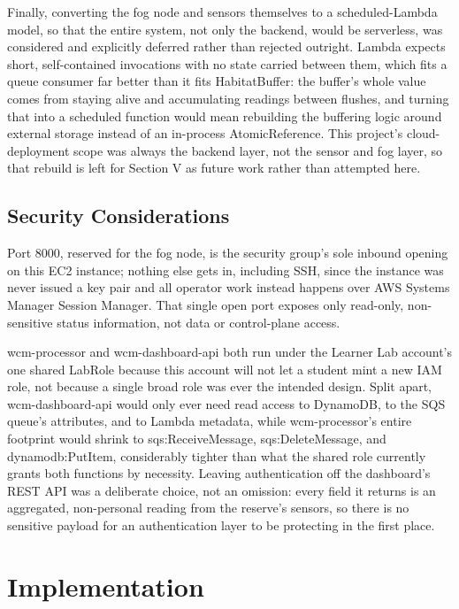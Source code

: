 \documentclass[conference,a4paper]{IEEEtran}
\begin{document}
Finally, converting the fog node and sensors themselves to a scheduled-Lambda model, so that the entire system, not only the backend, would be serverless, was considered and explicitly deferred rather than rejected outright. Lambda expects short, self-contained invocations with no state carried between them, which fits a queue consumer far better than it fits HabitatBuffer: the buffer's whole value comes from staying alive and accumulating readings between flushes, and turning that into a scheduled function would mean rebuilding the buffering logic around external storage instead of an in-process AtomicReference. This project's cloud-deployment scope was always the backend layer, not the sensor and fog layer, so that rebuild is left for Section V as future work rather than attempted here.

\subsection{Security Considerations}

Port 8000, reserved for the fog node, is the security group's sole inbound opening on this EC2 instance; nothing else gets in, including SSH, since the instance was never issued a key pair and all operator work instead happens over AWS Systems Manager Session Manager. That single open port exposes only read-only, non-sensitive status information, not data or control-plane access.

wcm-processor and wcm-dashboard-api both run under the Learner Lab account's one shared LabRole because this account will not let a student mint a new IAM role, not because a single broad role was ever the intended design. Split apart, wcm-dashboard-api would only ever need read access to DynamoDB, to the SQS queue's attributes, and to Lambda metadata, while wcm-processor's entire footprint would shrink to sqs:ReceiveMessage, sqs:DeleteMessage, and dynamodb:PutItem, considerably tighter than what the shared role currently grants both functions by necessity. Leaving authentication off the dashboard's REST API was a deliberate choice, not an omission: every field it returns is an aggregated, non-personal reading from the reserve's sensors, so there is no sensitive payload for an authentication layer to be protecting in the first place.

\section{Implementation}
\end{document}
